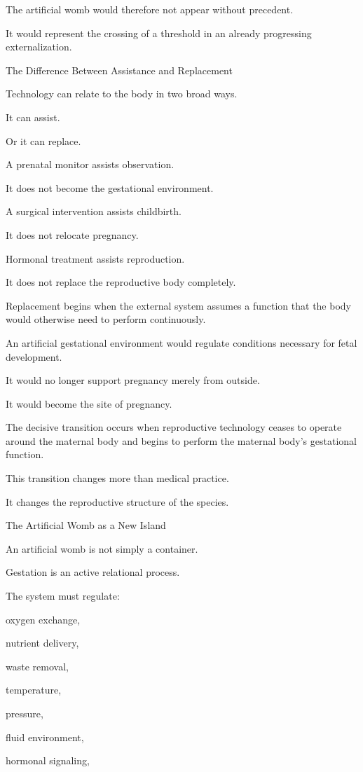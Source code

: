 The artificial womb would therefore not appear without precedent.

It would represent the crossing of a threshold in an already progressing externalization.

The Difference Between Assistance and Replacement

Technology can relate to the body in two broad ways.

It can assist.

Or it can replace.

A prenatal monitor assists observation.

It does not become the gestational environment.

A surgical intervention assists childbirth.

It does not relocate pregnancy.

Hormonal treatment assists reproduction.

It does not replace the reproductive body completely.

Replacement begins when the external system assumes a function that the body would otherwise need to perform continuously.

An artificial gestational environment would regulate conditions necessary for fetal development.

It would no longer support pregnancy merely from outside.

It would become the site of pregnancy.

The decisive transition occurs when reproductive technology ceases to operate around the maternal body and begins to perform the maternal body’s gestational function.

This transition changes more than medical practice.

It changes the reproductive structure of the species.

The Artificial Womb as a New Island

An artificial womb is not simply a container.

Gestation is an active relational process.

The system must regulate:

oxygen exchange,

nutrient delivery,

waste removal,

temperature,

pressure,

fluid environment,

hormonal signaling,

